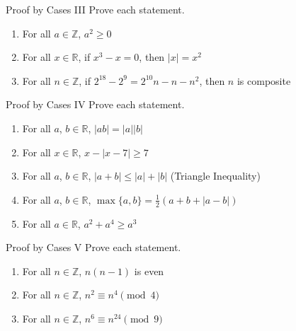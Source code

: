 \documentclass[12pt,letterpaper]{article}
\begin{document}
\begin{problem}{Proof by Cases III}
 Prove each statement.

 \begin{enumerate}[\hspace{.5cm}a.]
  \item For all $a\in\mathbb{Z}$, $a^2\ge 0$
  \item For all $x\in\mathbb{R}$, if $x^3-x=0$, then $\left|x\right|=x^2$
  \item For all $n\in\mathbb{Z}$, if $2^{18} - 2^9 = 2^{10}n - n - n^2$,
  then $n$ is composite
 \end{enumerate}
\end{problem}

\begin{problem}{Proof by Cases IV}
 Prove each statement.

 \begin{enumerate}[\hspace{.5cm}a.]
  \item For all $a$, $b\in\mathbb{R}$,
  $\left|ab\right|=\left|a\right|\left|b\right|$
  \item For all $x\in\mathbb{R}$, $x-\left|x-7\right|\ge7$
  \item For all $a$, $b\in\mathbb{R}$,
  $\left|a+b\right|\le\left|a\right|+\left|b\right|$ \hfill
  (Triangle Inequality)
  \item For all $a$, $b\in\mathbb{R}$, $\max{\{a,b\}} = \frac{1}{2} \left(
  a + b + \left|a-b\right| \right)$
  \item For all $a\in\mathbb{R}$, $a^2+a^4\ge a^3$
 \end{enumerate}
\end{problem}

\begin{problem}{Proof by Cases V}
 Prove each statement.

 \begin{enumerate}[\hspace{.5cm}a.]
  \item For all $n\in\mathbb{Z}$, $n(n-1)$ is even
  \item For all $n\in\mathbb{Z}$, $n^2 \equiv n^4 \pmod{4}$
  \item For all $n\in\mathbb{Z}$, $n^6 \equiv n^{24} \pmod{9}$
 \end{enumerate}
\end{problem}
\end{document}
